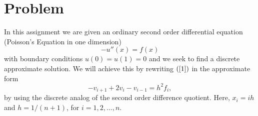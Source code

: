 \documentclass[a4paper, 12pt, twoside]{article}
\begin{document}
\section{Problem}

In this assignment we are given an ordinary second order differential equation (Poisson's Equation in one dimension)
\begin{equation} 
\label{1}
-u''(x) = f(x)
\end{equation} 
with boundary conditions $u(0) = u(1) = 0$
and we seek to find a discrete approximate solution. We will  achieve this by rewriting $(\ref{1})$ in the approximate form
\begin{equation}
\label{2}
-v_{i+1} +2v_{i}-v_{i-1} = h^2f_i,
\end{equation}
by using the discrete analog of the second order difference quotient. Here, $x_i = ih$ and $h = 1/(n+1)$, for $i = 1,2,\dots,n$. 
 
\end{document}
